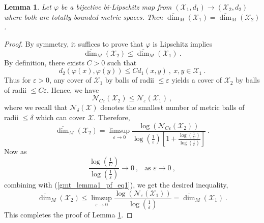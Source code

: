 \documentclass[12pt]{amsart}
\newtheorem{lemma}[theorem]{Lemma}
\theoremstyle{definition}
\numberwithin{equation}{section}
\begin{document}
\begin{lemma} \label{gmt_lemma1}
Let $\varphi$ be a bijective bi-Lipschitz map from $(\mathcal{X}_1,d_1) \to (\mathcal{X}_2,d_2)$ where both are totally bounded metric spaces. Then $\overline{\dim}_M\left(\mathcal{X}_1\right)=\overline{\dim}_M\left(\mathcal{X}_2\right)$\:.
\end{lemma}
\begin{proof}
By symmetry, it suffices to prove that $\varphi$ is Lipschitz implies $$\overline{\dim}_M\left(\mathcal{X}_2\right) \le \overline{\dim}_M\left(\mathcal{X}_1\right)\:.$$
By definition, there exists $C>0$ such that
\begin{equation*}
d_2\left(\varphi(x),\varphi(y)\right) \le C d_1(x,y)\:,\:x,y \in \mathcal{X}_1\:.
\end{equation*}
Thus for $\varepsilon>0$, any cover of $\mathcal{X}_1$ by balls of radii $\le \varepsilon$ yields a cover of $\mathcal{X}_2$ by balls of radii $\le C\varepsilon$. Hence, we have
\begin{equation} \label{gmt_lemma1_pf_eq1}
\mathcal{N}_{C\varepsilon}\left(\mathcal{X}_2\right) \le \mathcal{N}_{\varepsilon}\left(\mathcal{X}_1\right)\:,
\end{equation}
where we recall that $\mathcal{N}_{\delta}\left(\mathcal{X}\right)$ denotes the smallest number of metric balls of radii $\le \delta$ which can cover $\mathcal{X}$. Therefore,
\begin{equation*}
\overline{\dim}_M\left(\mathcal{X}_2\right) = \limsup_{\varepsilon \to 0} \frac{\log\left(\mathcal{N}_{C\varepsilon}\left(\mathcal{X}_2\right) \right)}{\log\left(\frac{1}{\varepsilon}\right)\left[1+\frac{\log\left(\frac{1}{C}\right)}{\log\left(\frac{1}{\varepsilon}\right)}\right]}\:.
\end{equation*}
Now as 
\begin{equation*}
\frac{\log\left(\frac{1}{C}\right)}{\log\left(\frac{1}{\varepsilon}\right)} \to 0\:,\:\:\text{ as } \varepsilon \to 0\:,
\end{equation*}
combining with (\ref{gmt_lemma1_pf_eq1}), we get the desired inequality,
$$\overline{\dim}_M\left(\mathcal{X}_2\right) \le \limsup_{\varepsilon \to 0} \frac{\log\left(\mathcal{N}_{\varepsilon}\left(\mathcal{X}_1\right) \right)}{\log\left(\frac{1}{\varepsilon}\right)} = \overline{\dim}_M\left(\mathcal{X}_1\right)\:.$$
This completes the proof of Lemma \ref{gmt_lemma1}.
\end{proof}
\end{document}
